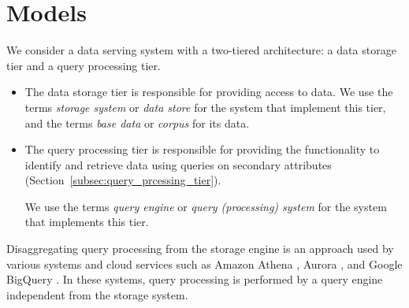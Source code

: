 

\section{Models}
We consider a data serving system with a two-tiered architecture: a data storage tier and a query processing tier.

\begin{itemize}
\item The data storage tier is responsible for providing access to data.
We use the terms \textit{storage system} or \textit{data store} for the system that implement this tier, and the terms
\textit{base data} or \textit{corpus} for its data.
\item The query processing tier is responsible for providing the functionality to identify and retrieve data using
queries on secondary attributes (Section~\ref{subsec:query_prcessing_tier}).

We use the terms \textit{query engine} or \textit{query (processing) system} for the system that implements this tier.
\end{itemize}

Disaggregating query processing from the storage engine is an approach used by various systems and cloud
services such as Amazon Athena \cite{aws:athena}, Aurora \cite{aws:aurora}, and Google BigQuery
\cite{google:bigquery}.
In these systems, query processing is performed by a query engine independent from the storage system.

